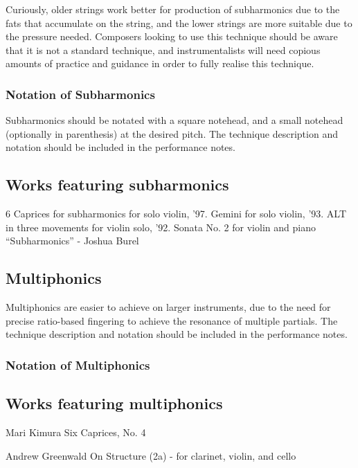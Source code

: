     Curiously, older strings work better for production of subharmonics due to the fats that accumulate on the string, and the lower strings are more suitable due to the pressure needed.\autocite{kimuraHowProduceSubharmonics1999}
Composers looking to use this technique should be aware that it is not a standard technique, and instrumentalists will need copious amounts of practice and guidance in order to fully realise this technique.

\subsubsection{Notation of Subharmonics}
Subharmonics should be notated with a square notehead, and a small notehead (optionally in parenthesis) at the desired pitch.
The technique description and notation should be included in the performance notes.

\subsection{Works featuring subharmonics}

6 Caprices for subharmonics for solo violin, '97.
Gemini for solo violin, '93.
ALT in three movements for violin solo, '92.
Sonata No. 2 for violin and piano “Subharmonics” - Joshua Burel

\subsection{Multiphonics}
Multiphonics are easier to achieve on larger instruments, due to the need for precise ratio-based fingering to achieve the resonance of multiple partials.
The technique description and notation should be included in the performance notes.
\lipsum[4]

\subsubsection{Notation of Multiphonics}

\subsection{Works featuring multiphonics}

Mari Kimura Six Caprices, No. 4 

Andrew Greenwald On Structure (2a) - for clarinet, violin, and cello


